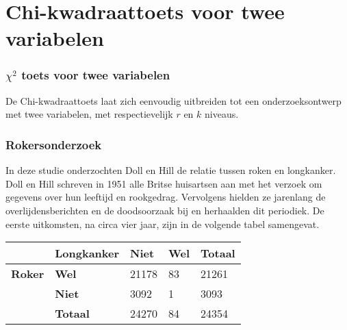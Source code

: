 \documentclass[aspectratio=169]{beamer}
\begin{document}
\section{Chi-kwadraattoets voor twee variabelen}

\begin{frame}
  \frametitle{$\chi^{2}$ toets voor twee variabelen}
  De Chi-kwadraattoets  laat zich eenvoudig uitbreiden tot een onderzoeksontwerp met twee variabelen, met respectievelijk $r$ en $k$ niveaus.
\end{frame}

\begin{frame}
  \frametitle{Rokersonderzoek}
  In deze studie onderzochten Doll en Hill de relatie tussen roken en longkanker. Doll en Hill schreven in 1951 alle Britse huisartsen aan met het verzoek om gegevens over hun leeftijd en rookgedrag. Vervolgens hielden ze jarenlang de overlijdensberichten en de doodsoorzaak bij en herhaalden dit periodiek. De eerste uitkomsten, na circa vier jaar, zijn in de volgende tabel samengevat.
  
  \begin{table}[h]
    \begin{tabular}{@{}lllll@{}}
      \toprule
      & \textbf{Longkanker} & \textbf{Niet} & \textbf{Wel} & \textbf{Totaal} \\ \midrule
      \textbf{Roker} & \textbf{Wel}        & 21178         & 83           & 21261           \\
      & \textbf{Niet}       & 3092          & 1            & 3093            \\
      & \textbf{Totaal}     & 24270         & 84           & 24354           \\ \bottomrule
    \end{tabular}
  \end{table}
\end{frame}
\end{document}
